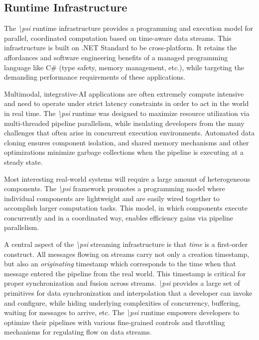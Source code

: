 \documentclass[letterpaper]{article} %
\newcommand{\psif}{\emph{\textbackslash psi} }
\begin{document}
\subsection{Runtime Infrastructure}

The \psif runtime infrastructure provides a programming and execution model for parallel, coordinated computation based on time-aware data streams. This infrastructure is built on .NET Standard to be cross-platform. It retains the affordances and software engineering benefits of a managed programming language like C\# (type safety, memory management, etc.), while targeting the demanding performance requirements of these applications.

Multimodal, integrative-AI applications are often extremely compute intensive and need to operate under strict latency constraints in order to act in the world in real time. The \psif runtime was designed to maximize resource utilization via multi-threaded pipeline parallelism, while insulating developers from the many challenges that often arise in concurrent execution environments. Automated data cloning ensures component isolation, and shared memory mechanisms and other optimizations minimize garbage collections when the pipeline is executing at a steady state.

Most interesting real-world systems will require a large amount of heterogeneous components. The \psif framework promotes a programming model where individual components are lightweight and are easily wired together to accomplish larger computation tasks. This model, in which components execute concurrently and in a coordinated way, enables efficiency gains via pipeline parallelism.

A central aspect of the \psif streaming infrastructure is that \emph{time} is a first-order construct. All messages flowing on streams carry not only a creation timestamp, but also an \emph{originating} timestamp which corresponds to the time when that message entered the pipeline from the real world. This timestamp is critical for proper synchronization and fusion across streams. \psif provides a large set of primitives for data synchronization and interpolation that a developer can invoke and configure, while hiding underlying complexities of concurrency, buffering, waiting for messages to arrive, etc. The \psif runtime empowers developers to optimize their pipelines with various fine-grained controls and throttling mechanisms for regulating flow on data streams.
\end{document}

